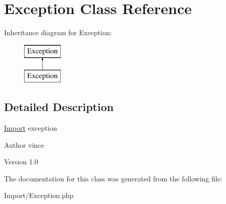 \hypertarget{class_anemo_1_1_import_1_1_exception}{
\section{Exception Class Reference}
\label{class_anemo_1_1_import_1_1_exception}
}
Inheritance diagram for Exception:\begin{figure}[H]
\begin{center}
\leavevmode
\includegraphics[height=2.000000cm]{class_anemo_1_1_import_1_1_exception}
\end{center}
\end{figure}


\subsection{Detailed Description}
\hyperlink{class_anemo_1_1_import}{Import} exception \begin{DoxyAuthor}{Author}
vince 
\end{DoxyAuthor}
\begin{DoxyVersion}{Version}
1.0 
\end{DoxyVersion}


The documentation for this class was generated from the following file:\begin{DoxyCompactItemize}
\item 
Import/Exception.php\end{DoxyCompactItemize}
